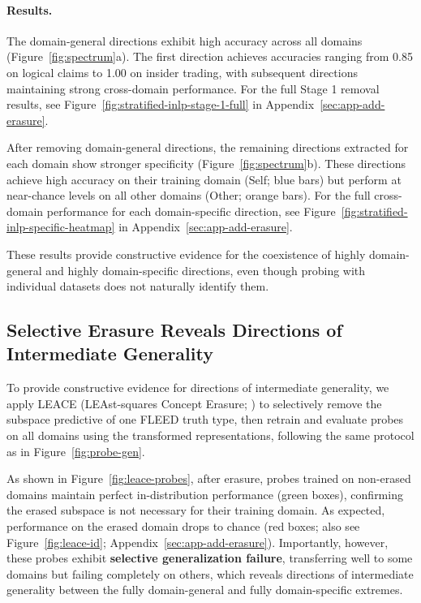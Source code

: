 \documentclass{article}
\theoremstyle{plain}
\theoremstyle{definition}
\theoremstyle{remark}
\begin{document}
\paragraph{Results.} The domain-general directions exhibit high accuracy across all domains (Figure~\ref{fig:spectrum}a). The first direction achieves accuracies 
ranging from 0.85 on logical claims to 1.00 on insider trading, with subsequent directions maintaining strong cross-domain performance. For the full Stage 1 removal results, see Figure~\ref{fig:stratified-inlp-stage-1-full} in Appendix~\ref{sec:app-add-erasure}.

After removing domain-general directions, the remaining directions extracted for each domain show stronger specificity (Figure~\ref{fig:spectrum}b). These directions achieve high accuracy on their training domain (Self; blue bars) but perform at near-chance levels on all other domains (Other; orange bars). 
For the full cross-domain performance for each domain-specific direction, see Figure~\ref{fig:stratified-inlp-specific-heatmap} in Appendix~\ref{sec:app-add-erasure}.

These results provide constructive evidence for the coexistence of highly domain-general and highly domain-specific directions, even though probing with individual datasets does not naturally identify them.

\subsection{Selective Erasure Reveals Directions of Intermediate Generality}

To provide constructive evidence for directions of intermediate generality, we apply LEACE (LEAst-squares Concept Erasure; \cite{belrose2023leace}) to selectively remove the subspace predictive of one FLEED truth type, then retrain and evaluate probes on all domains using the transformed representations, following the same protocol as in Figure~\ref{fig:probe-gen}.

As shown in Figure~\ref{fig:leace-probes}, after erasure, probes trained on non-erased domains maintain perfect in-distribution performance (green boxes), confirming the erased subspace is not necessary for their training domain. As expected, performance on the erased domain drops to chance (red boxes; also see Figure~\ref{fig:leace-id}; Appendix~\ref{sec:app-add-erasure}). Importantly, however, these probes exhibit \textbf{selective generalization failure}, transferring well to some domains but failing completely on others, which reveals directions of intermediate generality between the fully domain-general and fully domain-specific extremes.
\end{document}
